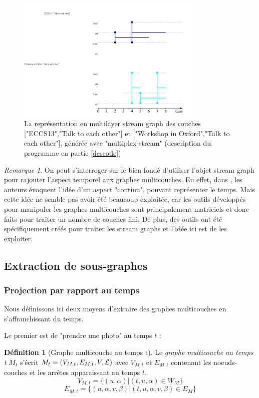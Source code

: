 \documentclass[11pt,a4paper]{article}
\theoremstyle{definition}
\newtheorem{defn}{Définition}
\theoremstyle{remark}
\newtheorem{rmq}{Remarque}
\theoremstyle{remark}
\begin{document}
	\begin{figure}[H]
		\centering
		\includegraphics[width=0.8\textwidth]{exMultiStream.JPG}
		\caption{La représentation en multilayer stream graph des couches ["ECCS13","Talk to each other"] et ["Workshop in Oxford","Talk to each other"], générée avec "multiplex-stream" (description du programme en partie \cref{descode})}
	\end{figure}
	
	\begin{rmq}
		On peut s'interroger sur le bien-fondé d'utiliser l'objet stream graph pour rajouter l'aspect temporel aux graphes multicouches. En effet, dans \cite{mlkiv}, les auteurs évoquent l'idée d'un aspect "continu", pouvant représenter le temps. Mais cette idée ne semble pas avoir été beaucoup exploitée, car les outils développés pour manipuler les graphes multicouches sont principalement matriciels et donc faits pour traiter un nombre de couches fini. De plus, des outils ont été spécifiquement créés pour traiter les stream graphs et l'idée ici est de les exploiter.
	
	\end{rmq}

\subsection{Extraction de sous-graphes}
\label{sousgraphes}
\subsubsection{Projection par rapport au temps}
	Nous définissons ici deux moyens d'extraire des graphes multicouches en s'affranchissant du temps.
	
	Le premier est de "prendre une photo" au temps $t$ :
	\begin{defn}[Graphe multicouche au temps t]
   	Le {\em graphe multicouche au temps t} $M_t$ s'écrit $M_t = (V_{M,t}, E_{M,t},V,{\cal L})$ avec $V_{M,t}$ et $E_{M,t}$ contenant les noeuds-couches et les arrêtes apparaissant au temps $t$.
   	$$ V_{M,t} = \{ (u,\alpha) | (t,u,\alpha) \in W_M\} $$
   	$$ E_{M,t} = \{(u,\alpha,v,\beta) | (t,u,\alpha,v,\beta) \in E_M\}$$

   \end{defn}
\end{document}
